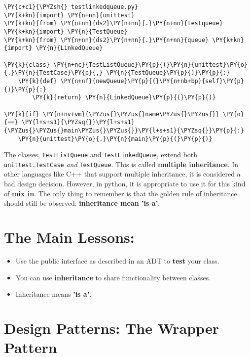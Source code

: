 \begin{Verbatim}[commandchars=\\\{\}]
\PY{c+c1}{\PYZsh{} testlinkedqueue.py}
\PY{k+kn}{import} \PY{n+nn}{unittest}
\PY{k+kn}{from} \PY{n+nn}{ds2}\PY{n+nn}{.}\PY{n+nn}{testqueue} \PY{k+kn}{import} \PY{n}{TestQueue}
\PY{k+kn}{from} \PY{n+nn}{ds2}\PY{n+nn}{.}\PY{n+nn}{queue} \PY{k+kn}{import} \PY{n}{LinkedQueue}

\PY{k}{class} \PY{n+nc}{TestListQueue}\PY{p}{(}\PY{n}{unittest}\PY{o}{.}\PY{n}{TestCase}\PY{p}{,} \PY{n}{TestQueue}\PY{p}{)}\PY{p}{:}
    \PY{k}{def} \PY{n+nf}{newQueue}\PY{p}{(}\PY{n+nb+bp}{self}\PY{p}{)}\PY{p}{:}
        \PY{k}{return} \PY{n}{LinkedQueue}\PY{p}{(}\PY{p}{)}

\PY{k}{if} \PY{n+nv+vm}{\PYZus{}\PYZus{}name\PYZus{}\PYZus{}} \PY{o}{==} \PY{l+s+s1}{\PYZsq{}}\PY{l+s+s1}{\PYZus{}\PYZus{}main\PYZus{}\PYZus{}}\PY{l+s+s1}{\PYZsq{}}\PY{p}{:}
    \PY{n}{unittest}\PY{o}{.}\PY{n}{main}\PY{p}{(}\PY{p}{)}
\end{Verbatim}



The classes, \texttt{TestListQueue} and \texttt{TestLinkedQueue}, extend both \texttt{unittest.TestCase} \emph{and} \texttt{TestQueue}.
This is called \textbf{multiple inheritance}.
In other languages like C++ that support multiple inheritance, it is considered a bad design decision.
However, in python, it is appropriate to use it for this kind of \textbf{mix in}.
The only thing to remember is that the golden rule of inheritance should still be observed: \textbf{inheritance mean 'is a'}.

\section{The Main Lessons:}

\begin{itemize}

\item Use the public interface as described in an ADT to \textbf{test} your class.

\item You can use \textbf{inheritance} to share functionality between classes.

\item Inheritance means \textbf{'is a'}.

\end{itemize}
\section{Design Patterns:  The Wrapper Pattern}


